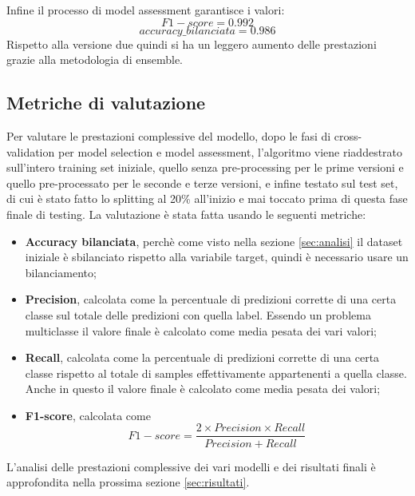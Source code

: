 Infine il processo di model assessment garantisce i valori:
$$F1-score = 0.992$$
$$accuracy\_bilanciata = 0.986$$
Rispetto alla versione due quindi si ha un leggero aumento delle prestazioni grazie alla metodologia di ensemble.

\subsection{Metriche di valutazione}
Per valutare le prestazioni complessive del modello, dopo le fasi di cross-validation per model selection e model assessment, l'algoritmo viene riaddestrato sull'intero training set iniziale, quello senza pre-processing per le prime versioni e quello pre-processato per le seconde e terze versioni, e infine testato sul test set, di cui è stato fatto lo splitting al 20\% all'inizio e mai toccato prima di questa fase finale di testing. La valutazione è stata fatta usando le seguenti metriche:
\begin{itemize}
\item \textbf{Accuracy bilanciata}, perchè come visto nella sezione \ref{sec:analisi} il dataset iniziale è sbilanciato rispetto alla variabile target, quindi è necessario usare un bilanciamento;
\item \textbf{Precision}, calcolata come la percentuale di predizioni corrette di una certa classe sul totale delle predizioni con quella label. Essendo un problema multiclasse il valore finale è calcolato come media pesata dei vari valori;
\item \textbf{Recall}, calcolata come la percentuale di predizioni corrette di una certa classe rispetto al totale di samples effettivamente appartenenti a quella classe. Anche in questo il valore finale è calcolato come media pesata dei valori;
\item \textbf{F1-score}, calcolata come
\begin{equation}
F1-score = \frac{2 \times Precision \times Recall}{Precision+Recall}
\end{equation}
\end{itemize}

L'analisi delle prestazioni complessive dei vari modelli e dei risultati finali è approfondita nella prossima sezione \ref{sec:risultati}.